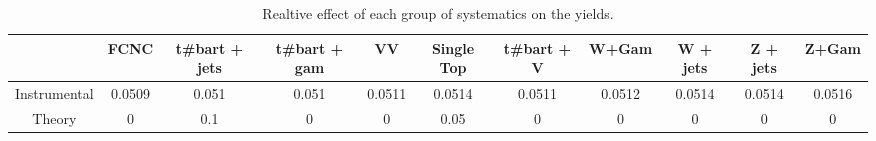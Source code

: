 \begin{table}[htbp]
\begin{center}
\begin{tabular}{|c|c|c|c|c|c|c|c|c|c|c|}
\hline 
      & FCNC      & t#bar{t} + jets      & t#bar{t} +  gam      & VV      & Single Top      & t#bar{t} + V      & W+Gam      & W + jets      & Z + jets      & Z+Gam \\ 
\hline 
 Instrumental & 0.0509 & 0.051 & 0.051 & 0.0511 & 0.0514 & 0.0511 & 0.0512 & 0.0514 & 0.0514 & 0.0516 \\ 
 Theory & 0 & 0.1 & 0 & 0 & 0.05 & 0 & 0 & 0 & 0 & 0 \\ 
\hline 
\end{tabular} 
\caption{Realtive effect of each group of systematics on the yields.} 
\end{center} 
\end{table} 
